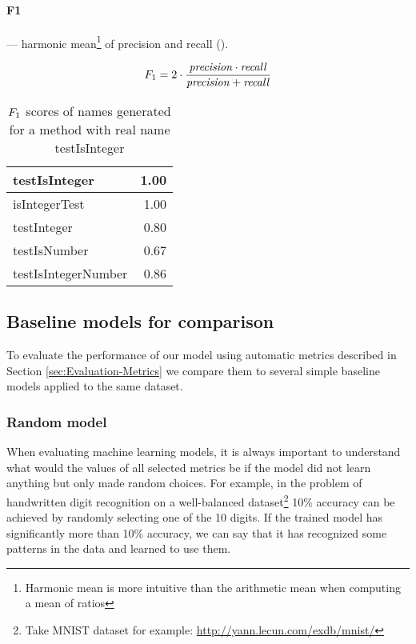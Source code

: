\paragraph{F1} --- harmonic mean\footnote{Harmonic mean is more intuitive than the arithmetic mean when computing a mean of ratios} of precision and recall (\cite{Sasa07}).

\[
F_1 = 2 \cdot \frac{\mathit{precision} \cdot \mathit{recall}}{\mathit{precision} + \mathit{recall}}
\]

\begin{table}[H]
\centering
\begin{tabular}{|l|r|}
  \hline
  testIsInteger & 1.00 \\
  \hline
  isIntegerTest & 1.00 \\
  \hline
  testInteger & 0.80 \\
  \hline
  testIsNumber & 0.67 \\
  \hline
  testIsIntegerNumber & 0.86 \\
  \hline
\end{tabular}
\caption{$F_1$ scores of names generated for a method with real name testIsInteger}
\end{table}

%

\subsection{Baseline models for comparison}
\label{sec:Evaluation-Baselines}

To evaluate the performance of our model using automatic metrics described in Section \ref{sec:Evaluation-Metrics} we compare them to several simple baseline models applied to the same dataset.

\subsubsection{Random model}

When evaluating machine learning models, it is always important to understand what would the values of all selected metrics be if the model did not learn anything but only made random choices. For example, in the problem of handwritten digit recognition on a well-balanced dataset\footnote{Take MNIST dataset for example: \url{http://yann.lecun.com/exdb/mnist/}} 10\% accuracy can be achieved by randomly selecting one of the 10 digits. If the trained model has significantly more than 10\% accuracy, we can say that it has recognized some patterns in the data and learned to use them.

